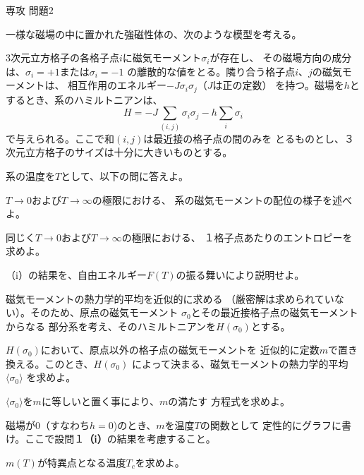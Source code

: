 \documentclass[fleqn]{jbook}
\begin{document}
\begin{question}{専攻 問題2}{}

一様な磁場の中に置かれた強磁性体の、次のような模型を考える。

3次元立方格子の各格子点$i$に磁気モーメント$\sigma _{i}$が存在し、
その磁場方向の成分は、$\sigma _{i} = +1$または$\sigma _{i} = -1$
の離散的な値をとる。隣り合う格子点$i$、$j$の磁気モーメントは、
相互作用のエネルギー$-J\sigma _{i}\sigma _{j}$（$J$は正の定数）
を持つ。磁場を$h$とするとき、系のハミルトニアンは、
\[
H = -J \sum_{(i,j)}\sigma _{i}\sigma _{j} - h \sum_{i}\sigma _{i}
\]
で与えられる。ここで和$(i,j)$は最近接の格子点の間のみを
とるものとし、３次元立方格子のサイズは十分に大きいものとする。

\begin{subquestions}
\SubQuestion
系の温度を$T$として、以下の問に答えよ。

\begin{subsubquestions}
\SubSubQuestion
$T \rightarrow 0$および$T \rightarrow \infty$の極限における、
系の磁気モーメントの配位の様子を述べよ。

\SubSubQuestion
同じく$T \rightarrow 0$および$T \rightarrow \infty$の極限における、
１格子点あたりのエントロピーを求めよ。

\SubSubQuestion
（i）の結果を、自由エネルギー$F(T)$の振る舞いにより説明せよ。　

\end{subsubquestions}

\SubQuestion
磁気モーメントの熱力学的平均を近似的に求める
（厳密解は求められていない）。そのため、原点の磁気モーメント
$\sigma _{0}$とその最近接格子点の磁気モーメントからなる
部分系を考え、そのハミルトニアンを$H(\sigma _{0})$とする。

\begin{subsubquestions}
\SubSubQuestion
$H(\sigma _{0})$において、原点以外の格子点の磁気モーメントを
近似的に定数$m$で置き換える。このとき、$H(\sigma _{0})$
によって決まる、磁気モーメントの熱力学的平均$\langle \sigma _{0} \rangle $
を求めよ。

\SubSubQuestion
$\langle \sigma _{0}\rangle $を$m$に等しいと置く事により、$m$の満たす
方程式を求めよ。

\SubSubQuestion
磁場が0（すなわち$h = 0$)のとき、$m$を温度$T$の関数として
定性的にグラフに書け。ここで設問１{\bf （i）}の結果を考慮すること。

\SubSubQuestion
$m(T)$が特異点となる温度$T_c$を求めよ。

\end{subsubquestions}
\end{subquestions}
\end{question}
\end{document}
